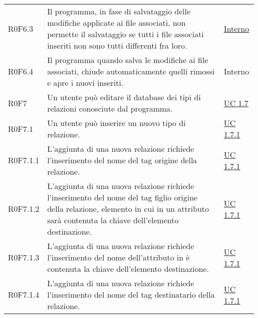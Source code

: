 \begin{center}
\begin{longtable}{p{4.2cm}!{\color{white}\vrule width 0.5mm}p{6cm}!{\color{white}\vrule width 0.5mm}p{2.5cm}!{\color{white}\vrule width 0.5mm}}
			\hspace{2mm}\hypertarget{XER0F6.3}{R0F6.3} & Il programma, in fase di salvataggio delle modifiche applicate ai file associati, non permette il salvataggio se tutti i file associati inseriti non sono tutti differenti fra loro. & \hyperref[subsec:XEUC1.6]{Interno}\\
			
			\hspace{2mm}\hypertarget{XER0F6.4}{R0F6.4} & Il programma quando salva le modifiche ai file associati, chiude automaticamente quelli rimossi e apre i nuovi inseriti. & Interno\\	
			
		\hspace{0mm}\hypertarget{XER0F7}{R0F7} & Un utente può editare il database dei tipi di relazioni conosciute dal programma. & \hyperref[subsec:XEUC1.7]{UC 1.7}\\
			
			\hspace{2mm}\hypertarget{XER0F7.1}{R0F7.1} & Un utente può inserire un nuovo tipo di relazione. & \hyperref[subsec:XEUC1.7.1]{UC 1.7.1}\\
			
				\hspace{4mm}\hypertarget{XER0F7.1.1}{R0F7.1.1} & L'aggiunta di una nuova relazione richiede l'inserimento del nome del tag origine della relazione. & \hyperref[subsec:XEUC1.7.1]{UC 1.7.1}\\
				
				\hspace{4mm}\hypertarget{XER0F7.1.2}{R0F7.1.2} & L'aggiunta di una nuova relazione richiede l'inserimento del nome del tag figlio origine della relazione, elemento in cui in un attributo sarà contenuta la chiave dell'elemento destinazione. & \hyperref[subsec:XEUC1.7.1]{UC 1.7.1}\\
					
				\hspace{4mm}\hypertarget{XER0F7.1.3}{R0F7.1.3} & L'aggiunta di una nuova relazione richiede l'inserimento del nome dell'attributo in è contenuta la chiave dell'elemento destinazione. & \hyperref[subsec:XEUC1.7.1]{UC 1.7.1}\\
					
				\hspace{4mm}\hypertarget{XER0F7.1.4}{R0F7.1.4} & L'aggiunta di una nuova relazione richiede l'inserimento del nome del tag destinatario della relazione. & \hyperref[subsec:XEUC1.7.1]{UC 1.7.1}\\
						

\end{longtable}
\end{center}
